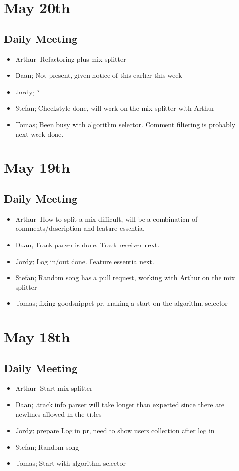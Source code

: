 \documentclass[]{article}
\begin{document}
\section*{May 20th}
\subsection*{Daily Meeting}
\begin{itemize}
	\item Arthur; Refactoring plus mix splitter 
	\item Daan; Not present, given notice of this earlier this week
	\item Jordy; ?
	\item Stefan; Checkstyle done, will work on the mix splitter with Arthur
	\item Tomas; Been busy with algorithm selector. Comment filtering is probably next week done.
\end{itemize}

\section*{May 19th}
\subsection*{Daily Meeting}
\begin{itemize}
	\item Arthur; How to split a mix difficult, will be a combination of comments/description and feature essentia.
	\item Daan; Track parser is done. Track receiver next.
	\item Jordy; Log in/out done. Feature essentia next.
	\item Stefan; Random song has a pull request, working with Arthur on the mix splitter
	\item Tomas; fixing goodsnippet pr, making a start on the algorithm selector
\end{itemize}

\section*{May 18th}
\subsection*{Daily Meeting}
\begin{itemize}
	\item Arthur; Start mix splitter
	\item Daan; .track info parser will take longer than expected since there are newlines allowed in the titles
	\item Jordy; prepare Log in pr, need to show users collection after log in
	\item Stefan; Random song
	\item Tomas; Start with algorithm selector
\end{itemize}
\end{document}

